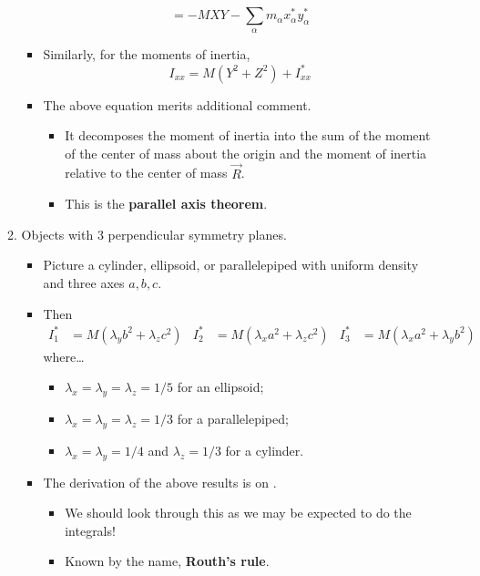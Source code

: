 \documentclass[../notes.tex]{subfiles}
\begin{document}
\begin{itemize}
\begin{enumerate}
\begin{itemize}
\begin{equation*}
                = -MXY-\sum_\alpha m_\alpha x_\alpha^*y_\alpha^*
            \end{equation*}
            \item Similarly, for the moments of inertia,
            \begin{equation*}
                I_{xx} = M(Y^2+Z^2)+I_{xx}^*
            \end{equation*}
            \item The above equation merits additional comment.
            \begin{itemize}
                \item It decomposes the moment of inertia into the sum of the moment of the center of mass about the origin and the moment of inertia relative to the center of mass $\vec{R}$.
                \item This is the \textbf{parallel axis theorem}.
            \end{itemize}
        \end{itemize}
        \item Objects with 3 perpendicular symmetry planes.
        \begin{itemize}
            \item Picture a cylinder, ellipsoid, or parallelepiped with uniform density and three axes $a,b,c$.
            \item Then
            \begin{align*}
                I_1^* &= M(\lambda_yb^2+\lambda_zc^2)&
                I_2^* &= M(\lambda_xa^2+\lambda_zc^2)&
                I_3^* &= M(\lambda_xa^2+\lambda_yb^2)
            \end{align*}
            where\dots
            \begin{itemize}
                \item $\lambda_x=\lambda_y=\lambda_z=1/5$ for an ellipsoid;
                \item $\lambda_x=\lambda_y=\lambda_z=1/3$ for a parallelepiped;
                \item $\lambda_x=\lambda_y=1/4$ and $\lambda_z=1/3$ for a cylinder.
            \end{itemize}
            \item The derivation of the above results is on \textcite[209-11]{bib:KibbleBerkshire}.
            \begin{itemize}
                \item We should look through this as we may be expected to do the integrals!
                \item Known by the name, \textbf{Routh's rule}.

\end{itemize}
\end{itemize}
\end{enumerate}
\end{itemize}
\end{document}
